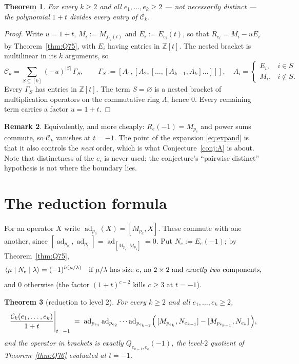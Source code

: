 \documentclass[11pt]{article}
\newtheorem{theorem}{Theorem}
\theoremstyle{definition}
\newtheorem{remark}[theorem]{Remark}
\newcommand{\Lam}{\Lambda}
\newcommand{\Z}{\mathbb{Z}}
\newcommand{\Ck}{\mathcal{C}}
\begin{document}
\begin{theorem}\label{thm:div}
For every $k\ge2$ and all $e_1,\dots,e_k\ge2$ --- not necessarily distinct --- the polynomial
$1+t$ divides every entry of $\Ck_k$.
\end{theorem}

\begin{proof}
Write $u=1+t$, $M_i:=M_{f_{e_i}(t)}$ and $E_i:=E_{e_i}(t)$, so that $R_{e_i}=M_i-uE_i$ by
Theorem~\ref{thm:Q75}, with $E_i$ having entries in $\Z[t]$. The nested bracket is multilinear in
its $k$ arguments, so
\begin{equation}\label{eq:expand}
\Ck_k=\sum_{S\subseteq[k]}(-u)^{|S|}\,\Gamma_S,
\qquad
\Gamma_S:=[A_1,[A_2,[\dots,[A_{k-1},A_k]\dots]]],\quad
A_i=\begin{cases}E_i,& i\in S\\ M_i,& i\notin S.\end{cases}
\end{equation}
Every $\Gamma_S$ has entries in $\Z[t]$. The term $S=\varnothing$ is a nested bracket of
multiplication operators on the commutative ring $\Lam$, hence $0$. Every remaining term carries
a factor $u=1+t$.
\end{proof}

\begin{remark}
Equivalently, and more cheaply: $R_e(-1)=M_{p_e}$ and power sums commute, so $\Ck_k$ vanishes at
$t=-1$. The point of the expansion \eqref{eq:expand} is that it also controls the \emph{next}
order, which is what Conjecture~\ref{conj:A} is about. Note that distinctness of the $e_i$ is
never used; the conjecture's ``pairwise distinct'' hypothesis is not where the boundary lies.
\end{remark}

\section{The reduction formula}

For an operator $X$ write $\operatorname{ad}_{p_a}(X)=[M_{p_a},X]$. These commute with one another,
since $[\operatorname{ad}_{p_a},\operatorname{ad}_{p_b}]=\operatorname{ad}_{[M_{p_a},M_{p_b}]}=0$.
Put $N_e:=E_e(-1)$; by Theorem~\ref{thm:Q75},
\[
\langle\mu\mid N_e\mid\lambda\rangle=(-1)^{h(\mu/\lambda)}
\quad\text{if $\mu/\lambda$ has size $e$, no $2\times2$ and \emph{exactly two} components,}
\]
and $0$ otherwise (the factor $(1+t)^{c-2}$ kills $c\ge3$ at $t=-1$).

\begin{theorem}[reduction to level $2$]\label{thm:red}
For every $k\ge2$ and all $e_1,\dots,e_k\ge2$,
\[
\frac{\Ck_k(e_1,\dots,e_k)}{1+t}\Bigg|_{t=-1}
\;=\;
\operatorname{ad}_{p_{e_1}}\operatorname{ad}_{p_{e_2}}\cdots\operatorname{ad}_{p_{e_{k-2}}}
\Bigl(\,[M_{p_{e_k}},N_{e_{k-1}}]-[M_{p_{e_{k-1}}},N_{e_k}]\,\Bigr),
\]
and the operator in brackets is exactly $Q_{e_{k-1},e_k}(-1)$, the level-$2$ quotient of
Theorem~\ref{thm:Q76} evaluated at $t=-1$.
\end{theorem}
\end{document}
